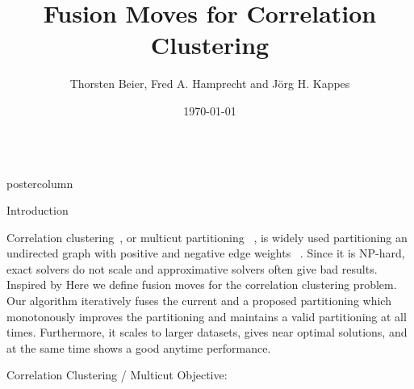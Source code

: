 \documentclass[final,hyperref={pdfpagelabels=false}]{beamer}
\title{\huge Fusion Moves for Correlation Clustering}
\author{Thorsten Beier, Fred A. Hamprecht and J\"org H. Kappes }
\institute[RWTH Aachen University]{Heidelberg Collaboratory for Image Processing, University of Heidelberg, Germany}
\date[\today]{\today}
\newlength{\columnheight}
\begin{document}
\begin{frame}
  \begin{columns}
    \begin{column}{.49\textwidth}
      \begin{beamercolorbox}[center,wd=\textwidth]{postercolumn}
        \begin{minipage}[T]{.95\textwidth}  %
          \parbox[t][\columnheight]{\textwidth}{ %
            \begin{block}{Introduction}


            Correlation clustering~\cite{Bansal-2002}, or multicut partitioning~\cite{chopra_1993_mp} ,
            is widely used partitioning an undirected graph with positive and negative edge weights
            ~\cite{andres_2011_iccv,kroeger_2012_eccv,yarkony_2012_eccv,alush_2013_simbad}.
            Since it is NP-hard, exact solvers do not scale and approximative solvers often give bad results.
            Inspired by \cite{Lempitsky-2010} Here we define fusion moves for the correlation clustering problem.
            Our algorithm iteratively fuses the current and a proposed partitioning which  monotonously improves
            the partitioning and maintains a valid partitioning at all times.
            Furthermore, it scales to larger datasets, gives near optimal solutions, and at the same time shows
            a good anytime performance.
           
            \end{block}
            \vfill
            \begin{block}{Correlation Clustering / Multicut Objective:}


\end{block}}
\end{minipage}
\end{beamercolorbox}
\end{column}
\end{columns}
\end{frame}
\end{document}

